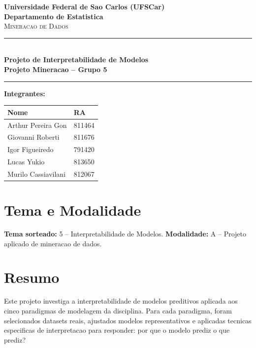\documentclass[10pt,a4paper]{article}
\begin{document}
\thispagestyle{fancy}

\begin{center}
{\Large \textbf{Universidade Federal de Sao Carlos (UFSCar)}}\\[0.1cm]
{\large \textbf{Departamento de Estatistica}}\\[0.15cm]
{\large \textsc{Mineracao de Dados}}\\[0.3cm]
\rule{\textwidth}{0.8pt}\\[0.15cm]
{\LARGE \textbf{Projeto de Interpretabilidade de Modelos}}\\[0.1cm]
{\large \textbf{Projeto Mineracao -- Grupo 5}}\\[0.2cm]
\rule{\textwidth}{0.8pt}
\end{center}

\vspace{0.1cm}

\noindent\textbf{Integrantes:}
\begin{center}
\begin{tabular}{|l|l|}
\hline
\textbf{Nome} & \textbf{RA} \\
\hline
Arthur Pereira Gon & 811464 \\
Giovanni Roberti & 811676 \\
Igor Figueiredo & 791420 \\
Lucas Yukio & 813650 \\
Murilo Cassiavilani & 812067 \\
\hline
\end{tabular}
\end{center}

\section*{Tema e Modalidade}

\textbf{Tema sorteado:} 5 -- Interpretabilidade de Modelos. \textbf{Modalidade:} A -- Projeto aplicado de mineracao de dados.

\section*{Resumo}

Este projeto investiga a interpretabilidade de modelos preditivos aplicada aos cinco paradigmas de modelagem da disciplina. Para cada paradigma, foram selecionados datasets reais, ajustados modelos representativos e aplicadas tecnicas especificas de interpretacao para responder: por que o modelo prediz o que prediz?
\end{document}
